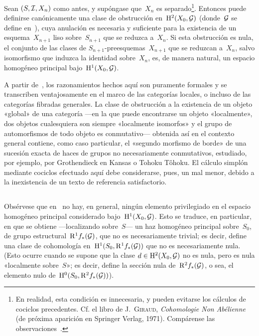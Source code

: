 
\begin{theoreme}
\label{III.6.3}
%
Sean $(S,\cal{I},X_n)$ como antes, y supóngase que~$X_n$ es separado\footnote{En realidad, esta condición es innecesaria, y pueden evitarse los cálculos de cociclos precedentes. Cf. el libro de J.\ \textsc{Giraud}, \emph{Cohomologie Non Abélienne} (de próxima aparición en Springer Verlag, 1971). Compárense las observaciones~.}. Entonces puede definirse canónicamente una clase de obstrucción en~$\H^2(X_0,\cal{G})$ (donde~$\cal{G}$ se define en~), cuya anulación es necesaria y suficiente para la existencia de un esquema~$X_{n+1}$ liso sobre~$S_{n+1}$ que se reduzca a~$X_n$. Si esta obstrucción es nula, el conjunto de las clases de $S_{n+1}$-preesquemas~$X_{n+1}$ que se reduzcan a~$X_n$, salvo isomorfismo que induzca la identidad sobre~$X_n$, es, de manera natural, un espacio homogéneo principal bajo~$\H^1(X_0,\cal{G})$.
\end{theoreme}

\begin{remarques}
\label{III.6.4}
A partir de~, los razonamientos hechos aquí son puramente formales y se transcriben ventajosamente en el marco de las categorías locales,
o incluso de las categorías fibradas generales. La clase de obstrucción a la existencia de un objeto «global» de una categoría ---en la que puede encontrarse un objeto «localmente», dos objetos cualesquiera son siempre «localmente isomorfos» y el grupo de automorfismos de todo objeto es conmutativo--- obtenida así en el contexto general contiene, como caso particular, el «segundo morfismo de borde» de una sucesión exacta de haces de grupos no necesariamente conmutativos, estudiado, por ejemplo, por Grothendieck en Kansas o
{Tohoku}
{T\^ohoku}.
El cálculo simplón mediante cociclos efectuado aquí debe considerarse, pues, un mal menor, debido a la inexistencia de un texto de referencia satisfactorio.
\end{remarques}

\setcounter{subsection}{4}%
\subsection{}
\label{III.6.5}
Obsérvese que en~ no hay, en general, ningún elemento privilegiado en el espacio homogéneo principal considerado bajo~$\H^1(X_0,\cal{G})$. Esto se traduce, en particular, en que se obtiene ---localizando sobre~$S$--- un haz homogéneo principal sobre~$S_0$, de grupo estructural~$\R^1f_*(\cal{G})$, que no es necesariamente trivial; es decir, define una clase de cohomología en~$\H^1(S_0,\R^1f_*(\cal{G}))$ que no es necesariamente nula. (Esto ocurre cuando se supone que la clase $d\in\H^2(X_0,\cal{G})$ no es nula, pero es nula «localmente sobre~$S$»; es decir, define la sección nula de~$\R^2f_*(\cal{G})$, o sea, el elemento nulo de~$\H^0(S_0,\R^2f_*(\cal{G}))$).

